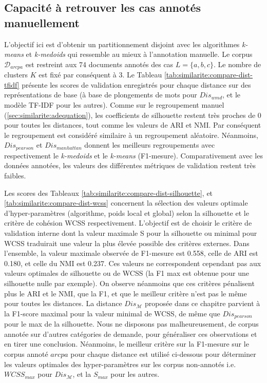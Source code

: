 \subsection{Capacité à retrouver les cas annotés manuellement}


L'objectif ici est d'obtenir un partitionnement disjoint avec les algorithmes \textit{k-means} et \textit{k-medoids} qui ressemble au mieux à l'annotation manuelle. Le corpus $\mathcal{D}_{arcpa}$ est restreint aux 74 documents annotés des cas $L = \lbrace a, b, c \rbrace$. Le  nombre de clusters $K$ est fixé par conséquent à 3. Le Tableau \ref{tab:similarite:compare-dist-tfidf} présente les scores de validation enregistrés pour chaque distance sur des représentations de base (à base de plongements de mots pour $Dis_{wmd}$, et le modèle TF-IDF pour les autres). Comme sur le regroupement manuel (\ref{sec:similarite:adequation}), les coefficients de silhouette restent très proches de 0 pour toutes les distances, tout comme les valeurs de ARI  et NMI. Par conséquent le regroupement est considéré similaire à un regroupement aléatoire. Néanmoins, $Dis_{pearson}$ et $Dis_{manhattan}$ donnent les meilleurs regroupements avec respectivement le \textit{k-medoids} et le \textit{k-means} (F1-mesure). Comparativement avec les données annotées, les valeurs des différentes métriques de validation restent très faibles. 

Les scores des Tableaux \ref{tab:similarite:compare-dist-silhouette}, et \ref{tab:similarite:compare-dist-wcss} concernent la sélection des valeurs optimale d'hyper-paramètres (algorithme, poids local et global) selon la silhouette  et le critère de cohésion WCSS respectivement. L'objectif est de choisir le critère de validation interne dont la valeur maximale S pour la silhouette ou minimal pour WCSS traduirait une valeur la plus élevée possible des critères externes. Dans l'ensemble, la valeur maximale observée de F1-mesure est 0.558, celle de ARI est 0.180, et celle du NMI est 0.237. Ces valeurs ne correspondent cependant pas aux valeurs optimales de silhouette ou de WCSS (la F1 max est obtenue pour une silhouette nulle par exemple). On observe néanmoins que ces critères pénalisent plus le ARI et le NMI, que la F1, et que le meilleur critère n'est pas le même pour toutes les distances. La distance $Dis_{\mathcal{M}}$ proposée dans ce chapitre parvient à la F1-score maximal pour la valeur minimal de WCSS, de même que $Dis_{pearson}$ pour le max de la silhouette. Nous ne disposons pas malheureusement, de corpus annotée sur d'autres catégories de demande, pour généraliser ces observations et en tirer une conclusion. Néanmoins, le meilleur critère sur la F1-mesure sur le corpus annoté $arcpa$ pour chaque distance est utilisé ci-dessous pour déterminer les valeurs optimales des hyper-paramètres sur les corpus non-annotés i.e. $WCSS_{max}$ pour $Dis_{\mathcal{M}}$, et la $S_{max}$ pour les autres.

